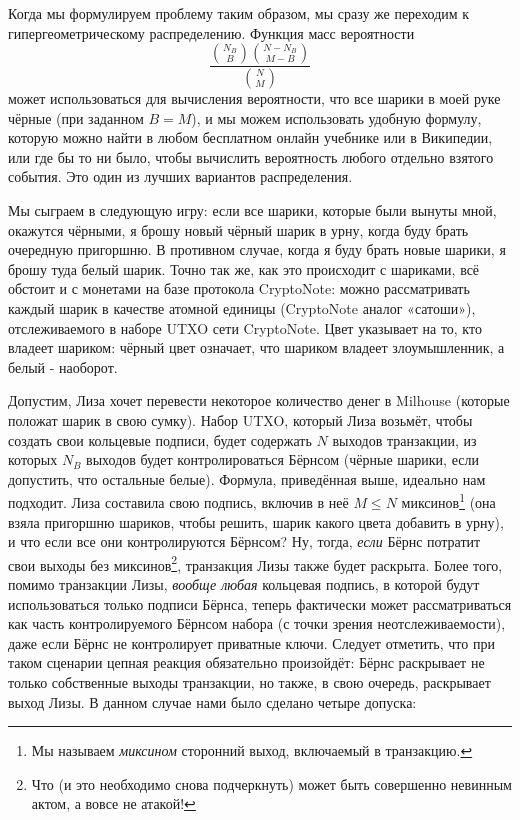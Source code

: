 \documentclass{mrl}
\begin{document}
Когда мы формулируем проблему таким образом, мы сразу же переходим к гипергеометрическому распределению. Функция масс вероятности \[\frac{\binom{N_B}{B}\binom{N - N_B}{M - B}}{\binom{N}{M}}\] может использоваться для вычисления вероятности, что все шарики в моей руке чёрные (при заданном $B=M$), и мы можем использовать удобную формулу, которую можно найти в любом бесплатном онлайн учебнике или в Википедии, или где бы то ни было, чтобы вычислить вероятность любого отдельно взятого события. Это один из лучших вариантов распределения.

Мы сыграем в следующую игру: если все шарики, которые были вынуты мной, окажутся чёрными, я брошу новый чёрный шарик в урну, когда буду брать очередную пригоршню. В противном случае, когда я буду брать новые шарики, я брошу туда белый шарик. Точно так же, как это происходит с шариками, всё обстоит и с монетами на базе протокола CryptoNote: можно рассматривать каждый шарик в качестве атомной единицы (CryptoNote аналог «сатоши»), отслеживаемого в наборе UTXO сети CryptoNote. Цвет указывает на то, кто владеет шариком: чёрный цвет означает, что шариком владеет злоумышленник, а белый - наоборот.

Допустим, Лиза хочет перевести некоторое количество денег в Milhouse (которые положат шарик в свою сумку). Набор UTXO, который Лиза возьмёт, чтобы создать свои кольцевые подписи, будет содержать $N$ выходов транзакции, из которых $N_B$ выходов будет контролироваться Бёрнсом (чёрные шарики, если допустить, что остальные белые). Формула, приведённая выше, идеально нам подходит. Лиза составила свою подпись, включив в неё $M \leq N$ миксинов\footnote{Мы называем {\it миксином} сторонний выход, включаемый в транзакцию.} (она взяла пригоршню шариков, чтобы решить, шарик какого цвета добавить в урну), и что если все они контролируются Бёрнсом? Ну, тогда, \emph{если} Бёрнс потратит свои выходы без миксинов\footnote{Что (и это необходимо снова подчеркнуть) может быть совершенно невинным актом, а вовсе не атакой!}, транзакция Лизы также будет раскрыта. Более того, помимо транзакции Лизы, \emph{вообще любая} кольцевая подпись, в которой будут использоваться только подписи Бёрнса, теперь фактически может рассматриваться как часть контролируемого Бёрнсом набора (с точки зрения неотслеживаемости), даже если Бёрнс не контролирует приватные ключи. Следует отметить, что при таком сценарии цепная реакция обязательно произойдёт: Бёрнс раскрывает не только собственные выходы транзакции, но также, в свою очередь, раскрывает выход Лизы. В данном случае нами было сделано четыре допуска:
\end{document}

